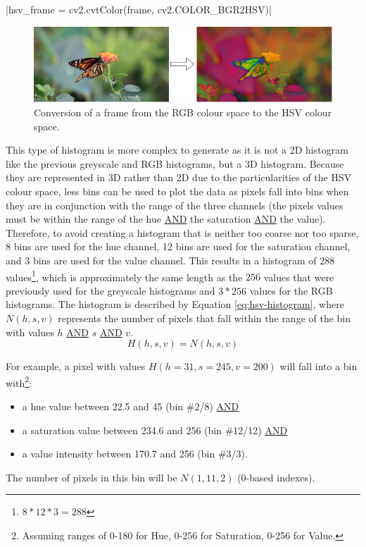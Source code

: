 |hsv_frame = cv2.cvtColor(frame, cv2.COLOR_BGR2HSV)|

\begin{figure}[h] 
\centerline{\includegraphics[width=\textwidth]{figures/implementation/rgb_to_hsv.png}}
\caption{\label{fig:rgb_to_hsv}Conversion of a frame from the RGB colour space to the HSV colour space.}
\end{figure}

This type of histogram is more complex to generate as it is not a 2D histogram like the previous greyscale and RGB histograms, but a 3D histogram. Because they are represented in 3D rather than 2D due to the particularities of the HSV colour space, less bins can be used to plot the data as pixels fall into bins when they are in conjunction with the range of the three channels (the pixels values must be within the range of the hue \underline{AND} the saturation \underline{AND} the value). Therefore, to avoid creating a histogram that is neither too coarse nor too sparse, 8 bins are used for the hue channel, 12 bins are used for the saturation channel, and 3 bins are used for the value channel. This results in a histogram of 288 values\footnote{$8*12*3=288$}, which is approximately the same length as the $256$ values that were previously used for the greyscale histograms and $3*256$ values for the RGB histograms. The histogram is described by Equation \ref{eq:hsv-histogram}, where $N(h,s,v)$ represents the number of pixels that fall within the range of the bin with values $h$ \underline{AND} $s$ \underline{AND} $v$.\\
\begin{equation}
\label{eq:hsv-histogram}
    H(h,s,v)=N(h,s,v)
\end{equation}

For example, a pixel with values $H(h=31, s=245, v=200)$ will fall into a bin with\footnote{Assuming ranges of 0-180 for Hue, 0-256 for Saturation, 0-256 for Value.}:
\begin{itemize}
    \item a hue value between 22.5 and 45 (bin \#2/8) \underline{AND}
    \item a saturation value between 234.6 and 256 (bin \#12/12) \underline{AND} 
    \item a value intensity between 170.7 and 256 (bin \#3/3).
\end{itemize}
The number of pixels in this bin will be $N(1,11,2)$ (0-based indexes).\\

